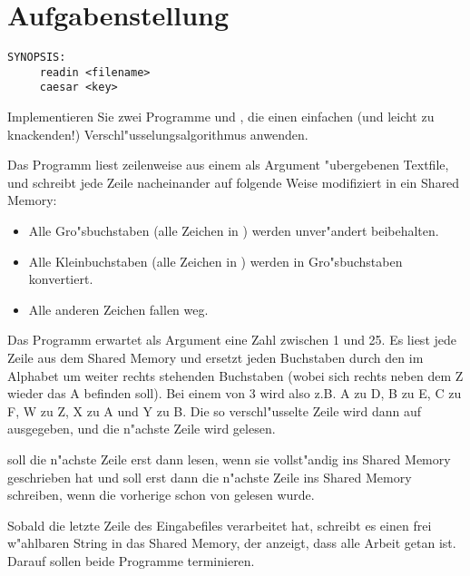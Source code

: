 




\section*{Aufgabenstellung}

\begin{verbatim}
SYNOPSIS:
     readin <filename>
     caesar <key>
\end{verbatim} 

Implementieren Sie zwei Programme  und , die
einen einfachen (und leicht zu knackenden!)
Verschl"usselungsalgorithmus anwenden.

Das Programm  liest zeilenweise aus einem als Argument
"ubergebenen Textfile, und schreibt jede Zeile nacheinander auf
folgende Weise modifiziert in ein Shared Memory:
\begin{itemize}
\item Alle Gro"sbuchstaben (alle Zeichen in \osueregex{[A-Z]}) werden
unver"andert beibehalten.
\item Alle Kleinbuchstaben (alle Zeichen in \osueregex{[a-z]}) werden in
Gro"sbuchstaben konvertiert.
\item Alle anderen Zeichen fallen weg.
\end{itemize}
Das Programm  erwartet als Argument eine Zahl zwischen 1
und 25. Es liest jede Zeile aus dem Shared Memory und ersetzt jeden
Buchstaben durch den im Alphabet um  weiter rechts stehenden
Buchstaben (wobei sich rechts neben dem Z wieder das A befinden
soll). Bei einem  von 3 wird also z.B. A zu D, B zu E, C zu
F, W zu Z, X zu A und Y zu B. Die so verschl"usselte Zeile wird dann
auf  ausgegeben, und die n"achste Zeile wird gelesen.

 soll die n"achste Zeile erst dann lesen, wenn
 sie vollst"andig ins Shared Memory geschrieben hat und
 soll erst dann die n"achste Zeile ins Shared Memory schreiben,
wenn die vorherige schon von  gelesen wurde.

Sobald  die letzte Zeile des Eingabefiles verarbeitet hat,
schreibt es einen frei w"ahlbaren String in das Shared Memory, der
 anzeigt, dass alle Arbeit getan ist. Darauf sollen beide
Programme terminieren.




